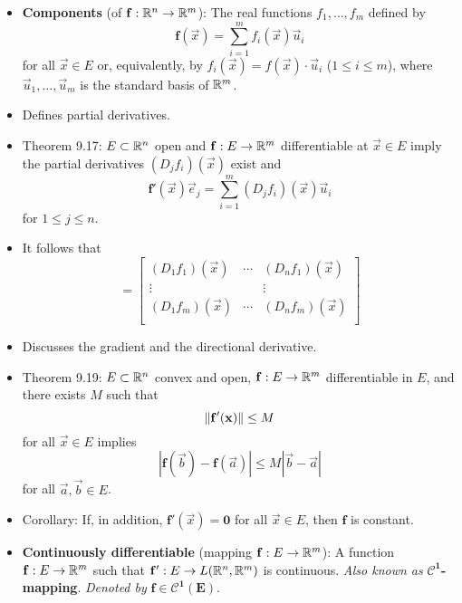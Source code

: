 \documentclass[../notes.tex]{subfiles}
\begin{document}
\begin{itemize}
\begin{proof}
    \end{proof}
    \item \textbf{Components} (of $\mathbf{f}:\mathbb{R}^n\to\mathbb{R}^m$): The real functions $f_1,\dots,f_m$ defined by
    \begin{equation*}
        \mathbf{f}(\vec{x}) = \sum_{i=1}^mf_i(\vec{x})\vec{u}_i
    \end{equation*}
    for all $\vec{x}\in E$ or, equivalently, by $f_i(\vec{x})=f(\vec{x})\cdot\vec{u}_i$ ($1\leq i\leq m$), where $\vec{u}_1,\dots,\vec{u}_m$ is the standard basis of $\mathbb{R}^m$.
    \item Defines partial derivatives.
    \item Theorem 9.17: $E\subset\mathbb{R}^n$ open and $\mathbf{f}:E\to\mathbb{R}^m$ differentiable at $\vec{x}\in E$ imply the partial derivatives $(D_jf_i)(\vec{x})$ exist and
    \begin{equation*}
        \mathbf{f}'(\vec{x})\vec{e}_j = \sum_{i=1}^m(D_jf_i)(\vec{x})\vec{u}_i
    \end{equation*}
    for $1\leq j\leq n$.
    \item It follows that
    \begin{equation*}
        [\mathbf{f}'(\vec{x})] =
        \begin{bmatrix}
            (D_1f_1)(\vec{x}) & \cdots & (D_nf_1)(\vec{x})\\
            \vdots &  & \vdots\\
            (D_1f_m)(\vec{x}) & \cdots & (D_nf_m)(\vec{x})\\
        \end{bmatrix}
    \end{equation*}
    \item Discusses the gradient and the directional derivative.
    \item Theorem 9.19: $E\subset\mathbb{R}^n$ convex and open, $\mathbf{f}:E\to\mathbb{R}^m$ differentiable in $E$, and there exists $M$ such that
    \begin{equation*}
        \norm{\mathbf{f}'(\mathbf{x})} \leq M
    \end{equation*}
    for all $\vec{x}\in E$ implies
    \begin{equation*}
        |\mathbf{f}(\vec{b})-\mathbf{f}(\vec{a})| \leq M|\vec{b}-\vec{a}|
    \end{equation*}
    for all $\vec{a},\vec{b}\in E$.
    \item Corollary: If, in addition, $\mathbf{f}'(\vec{x})=\bm{0}$ for all $\vec{x}\in E$, then $\mathbf{f}$ is constant.
    \item \textbf{Continuously differentiable} (mapping $\mathbf{f}:E\to\mathbb{R}^m$): A function $\mathbf{f}:E\to\mathbb{R}^m$ such that $\mathbf{f}':E\to L(\mathbb{R}^n,\mathbb{R}^m)$ is continuous. \emph{Also known as} \textbf{$\bm{\pmb{\mathscr{C}}^1}$-mapping}. \emph{Denoted by} $\bm{\mathbf{f}\in\pmb{\mathscr{C}}^1(E)}$.

\end{itemize}
\end{document}
